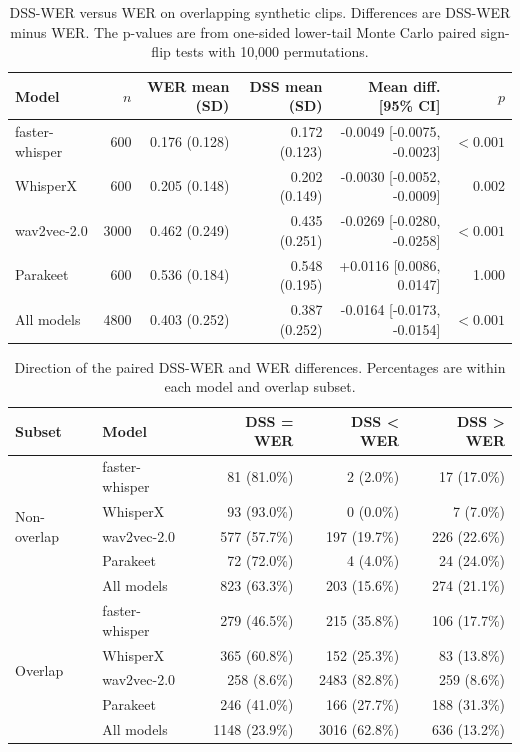 \begin{table}[htbp]
\centering
\caption{DSS-WER versus WER on overlapping synthetic clips. Differences are DSS-WER minus WER. The p-values are from one-sided lower-tail Monte Carlo paired sign-flip tests with 10,000 permutations.}
\label{tab:dss_wer_overlap_test}
\footnotesize
\setlength{\tabcolsep}{3pt}
\begin{tabular}{lrrrrr}
\toprule
\textbf{Model} & \textbf{$n$} & \textbf{WER mean (SD)} & \textbf{DSS mean (SD)} & \textbf{Mean diff. [95\% CI]} & \textbf{$p$} \\
\midrule
faster-whisper & 600 & 0.176 (0.128) & 0.172 (0.123) & -0.0049 [-0.0075, -0.0023] & $<0.001$ \\
WhisperX & 600 & 0.205 (0.148) & 0.202 (0.149) & -0.0030 [-0.0052, -0.0009] & 0.002 \\
wav2vec-2.0 & 3000 & 0.462 (0.249) & 0.435 (0.251) & -0.0269 [-0.0280, -0.0258] & $<0.001$ \\
Parakeet & 600 & 0.536 (0.184) & 0.548 (0.195) & +0.0116 [0.0086, 0.0147] & 1.000 \\
All models & 4800 & 0.403 (0.252) & 0.387 (0.252) & -0.0164 [-0.0173, -0.0154] & $<0.001$ \\
\bottomrule
\end{tabular}
\setlength{\tabcolsep}{6pt}
\normalsize
\end{table}

\begin{table}[htbp]
\centering
\caption{Direction of the paired DSS-WER and WER differences. Percentages are within each model and overlap subset.}
\label{tab:dss_wer_direction_counts}
\footnotesize
\setlength{\tabcolsep}{4pt}
\begin{tabular}{llrrr}
\toprule
\textbf{Subset} & \textbf{Model} & \textbf{DSS = WER} & \textbf{DSS < WER} & \textbf{DSS > WER} \\
\midrule
\multirow{5}{*}{Non-overlap}
& faster-whisper & 81 (81.0\%) & 2 (2.0\%) & 17 (17.0\%) \\
& WhisperX & 93 (93.0\%) & 0 (0.0\%) & 7 (7.0\%) \\
& wav2vec-2.0 & 577 (57.7\%) & 197 (19.7\%) & 226 (22.6\%) \\
& Parakeet & 72 (72.0\%) & 4 (4.0\%) & 24 (24.0\%) \\
& All models & 823 (63.3\%) & 203 (15.6\%) & 274 (21.1\%) \\
\midrule
\multirow{5}{*}{Overlap}
& faster-whisper & 279 (46.5\%) & 215 (35.8\%) & 106 (17.7\%) \\
& WhisperX & 365 (60.8\%) & 152 (25.3\%) & 83 (13.8\%) \\
& wav2vec-2.0 & 258 (8.6\%) & 2483 (82.8\%) & 259 (8.6\%) \\
& Parakeet & 246 (41.0\%) & 166 (27.7\%) & 188 (31.3\%) \\
& All models & 1148 (23.9\%) & 3016 (62.8\%) & 636 (13.2\%) \\
\bottomrule
\end{tabular}
\setlength{\tabcolsep}{6pt}
\normalsize
\end{table}

